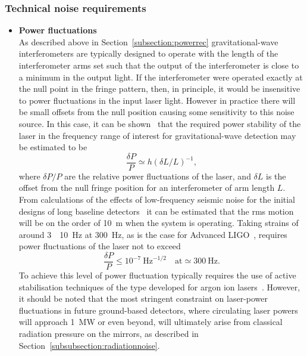 \documentclass{article}
\newcommand{\Hz}{Hz\super{-1/2}\xspace}
\begin{document}
\subsubsection{Technical noise requirements}
\label{subsubsection:lasernoise}

\begin{itemize}
\item \textbf{Power fluctuations} \\
As described above in Section~\ref{subsection:powerrec} gravitational-wave
interferometers are typically designed to operate with the length of the
interferometer arms set such that the output of the interferometer is close to a
minimum in the output light. If the interferometer were operated exactly at the
null point in the fringe pattern, then, in principle, it would be insensitive to
power fluctuations in the input laser light. However in practice there will be
small offsets from the null position causing some sensitivity to this noise
source.  In this case, it can be shown~\cite{Hough} that the required power
stability of the laser in the frequency range of interest for gravitational-wave
detection may be estimated to be
%
\begin{equation}
  \frac{\delta P}{P} \simeq h (\delta L/L)^{-1},
  \label{equation:intnoise1}
\end{equation}
%
where $\delta P/P$ are the relative power fluctuations of the laser, and $\delta
L$ is the offset from the null fringe position for an interferometer of arm
length $L$.  From calculations of the effects of low-frequency seismic noise for
the initial designs of long baseline detectors~\cite{Hough} it can be estimated
that the rms motion will be on the order of 10~m when the system is
operating. Taking strains of around 3~\texttimes~10~\Hz at
300~Hz, as is the case for Advanced LIGO~\cite{Harry:2010}, requires
power fluctuations of the laser not to exceed
%
\begin{equation}
  \frac{\delta P}{P} \leq 10^{-7} \mathrm{\ Hz}^{-1/2} \quad \mathrm{at}
  \simeq 300 \mathrm{\ Hz}.
  \label{equation:intnoise2}
\end{equation}
%
To achieve this level of power fluctuation typically requires the use of active
stabilisation techniques of the type developed for argon ion
lasers~\cite{Mangan}.
%
However, it should be noted that the most stringent constraint on laser-power fluctuations
in future ground-based detectors, where circulating laser powers will approach 1~MW or even beyond,
will ultimately arise from classical radiation pressure on the mirrors, as described in
Section~\ref{subsubsection:radiationnoise}.


\end{itemize}
\end{document}
